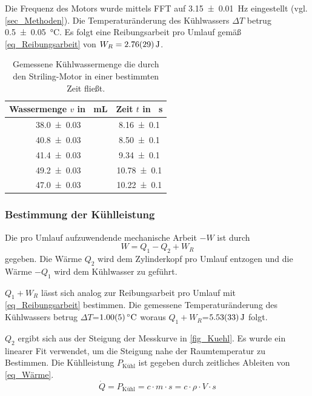 \documentclass[
	a4paper,
	12pt,
	pagesize,
	ngerman
]{scrartcl}
\begin{document}
	Die Frequenz des Motors wurde mittels FFT auf \SI{3,15+-0,01}{Hz} eingestellt (vgl. \cref{sec_Methoden}).
	Die Temperaturänderung des Kühlwassers $\Delta{T}$ betrug \SI{0,5+-0,05}{\degreeCelsius}.
	Es folgt eine Reibungsarbeit pro Umlauf gemäß \cref{eq_Reibungsarbeit} von $W_R=\SI{2,76+-0,29}{J}$.
	\begin{table}[H]
		\centering
		\begin{tabular}{ c | c }
			Wassermenge $v$ in \SI{}{mL} & Zeit $t$ in \SI{}{s} \\ \hline
			\SI{38,0+-0,03}{}&\SI{8,16+-0,1}{}\\
			\SI{40,8+-0,03}{}&\SI{8,50+-0,1}{}\\
			\SI{41,4+-0,03}{}&\SI{9,34+-0,1}{}\\
			\SI{49,2+-0,03}{}&\SI{10,78+-0,1}{}\\
			\SI{47,0+-0,03}{}&\SI{10,22+-0,1}{}\\
		\end{tabular}
		\caption{Gemessene Kühlwassermenge die durch den Striling-Motor in einer bestimmten Zeit fließt.}
		\label{tab_Durchfluss} 
	\end{table}
	
	\subsubsection{Bestimmung der Kühlleistung} \label{sssec_Kühlleistung}
	Die pro Umlauf aufzuwendende mechanische Arbeit $-W$ ist durch
	\begin{equation}
	W =  Q_1 - Q_2 + W_R
	\end{equation}
	gegeben.
	Die Wärme $Q_2$ wird dem Zylinderkopf pro Umlauf entzogen und die Wärme $-Q_1$ wird dem Kühlwasser zu geführt.
	
	$Q_1+W_R$ lässt sich analog zur Reibungsarbeit pro Umlauf mit \cref{eq_Reibungsarbeit} bestimmen.	
	Die gemessene Temperaturänderung des Kühlwassers betrug $\Delta{T}$=$\SI{1,0+-0,05}{\degreeCelsius}$ woraus $Q_1+W_R$=$\SI{5,53+-0,33}{J}$ folgt.
	
	$Q_2$ ergibt sich aus der Steigung der Messkurve in \cref{fig_Kuehl}.
	Es wurde ein linearer Fit verwendet, um die Steigung nahe der Raumtemperatur zu Bestimmen.
	Die Kühlleistung $P_\text{Kühl}$ ist gegeben durch zeitliches Ableiten von \cref{eq_Wärme}.
	\begin{equation}
	\dot{Q} = P_\text{Kühl} = c \cdot m \cdot s = c \cdot \rho \cdot V \cdot s
	\label{eq_Kühlleistung}
	\end{equation}
	
\end{document}
